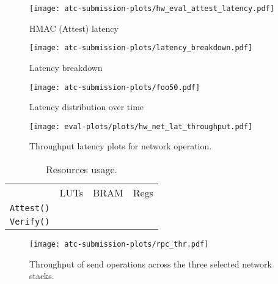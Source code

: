 \begin{figure*}[t!]
\begin{center}
  \centering
  \texttt{[image: atc-submission-plots/hw\_eval\_attest\_latency.pdf]} 
  \caption{HMAC (Attest) latency}
  \label{fig:attest_kernel}
\endminipage
{}
  \centering
  \texttt{[image: atc-submission-plots/latency\_breakdown.pdf]}
  \caption{Latency breakdown}\label{fig:latency_breakdown}
\endminipage

%
  \centering
  \texttt{[image: atc-submission-plots/foo50.pdf]}
  \caption{Latency distribution over time}\label{fig:latency_distribution}
\endminipage
\end{center}
\end{figure*}
\fi

\begin{figure}[t!]
    \centering
    \texttt{[image: eval-plots/plots/hw\_net\_lat\_throughput.pdf]}
    \caption{Throughput latency plots for network operation.}
    \label{fig:hw_lat_breakdown}
\end{figure}
\fi

\begin{center}
\begin{table}[ht]
\centering
\begin{tabular}{ |m{1.5cm}||m{1cm}| m{1cm}| m{1cm}|}
 \hline
  & LUTs &  BRAM & Regs  \\
 \texttt{Attest()} &  &  &\\
 \texttt{Verify()} &  &  &\\
 \hline
 \end{tabular}
\caption{Resources usage.}
\end{table}\label{table:resources_usage}
\end{center}
\fi




\begin{figure}
    \centering
   \texttt{[image: atc-submission-plots/rpc\_thr.pdf]}
   \vspace{-10pt}
    \caption{Throughput of send operations across the three selected network stacks.}
    \vspace{-4pt}
  \label{fig:net_throughput}
\end{figure}